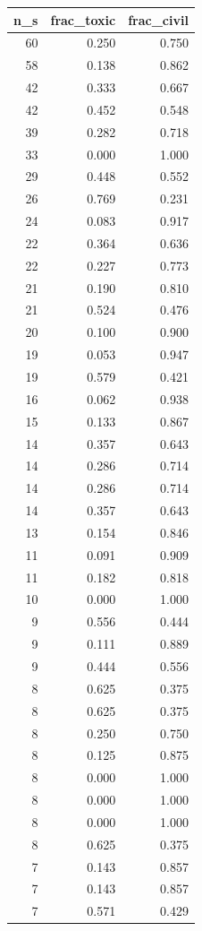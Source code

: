 \begin{tabular}{rrr}
\toprule
n_s & frac_toxic & frac_civil \\
\midrule
60 & 0.250 & 0.750 \\
58 & 0.138 & 0.862 \\
42 & 0.333 & 0.667 \\
42 & 0.452 & 0.548 \\
39 & 0.282 & 0.718 \\
33 & 0.000 & 1.000 \\
29 & 0.448 & 0.552 \\
26 & 0.769 & 0.231 \\
24 & 0.083 & 0.917 \\
22 & 0.364 & 0.636 \\
22 & 0.227 & 0.773 \\
21 & 0.190 & 0.810 \\
21 & 0.524 & 0.476 \\
20 & 0.100 & 0.900 \\
19 & 0.053 & 0.947 \\
19 & 0.579 & 0.421 \\
16 & 0.062 & 0.938 \\
15 & 0.133 & 0.867 \\
14 & 0.357 & 0.643 \\
14 & 0.286 & 0.714 \\
14 & 0.286 & 0.714 \\
14 & 0.357 & 0.643 \\
13 & 0.154 & 0.846 \\
11 & 0.091 & 0.909 \\
11 & 0.182 & 0.818 \\
10 & 0.000 & 1.000 \\
9 & 0.556 & 0.444 \\
9 & 0.111 & 0.889 \\
9 & 0.444 & 0.556 \\
8 & 0.625 & 0.375 \\
8 & 0.625 & 0.375 \\
8 & 0.250 & 0.750 \\
8 & 0.125 & 0.875 \\
8 & 0.000 & 1.000 \\
8 & 0.000 & 1.000 \\
8 & 0.000 & 1.000 \\
8 & 0.625 & 0.375 \\
7 & 0.143 & 0.857 \\
7 & 0.143 & 0.857 \\
7 & 0.571 & 0.429 \\

\end{tabular}
